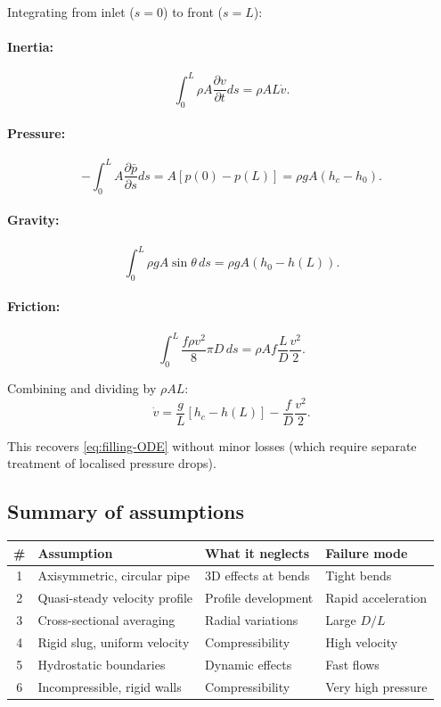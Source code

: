\documentclass[11pt]{article}
\begin{document}
Integrating from inlet ($s = 0$) to front ($s = L$):

\paragraph{Inertia:}
\[
  \int_0^L \rho A \frac{\partial v}{\partial t} ds = \rho A L \dot{v}.
\]

\paragraph{Pressure:}
\[
  -\int_0^L A \frac{\partial \bar{p}}{\partial s} ds = A[p(0) - p(L)] = \rho g A(h_c - h_0).
\]

\paragraph{Gravity:}
\[
  \int_0^L \rho g A \sin\theta \, ds = \rho g A(h_0 - h(L)).
\]

\paragraph{Friction:}
\[
  \int_0^L \frac{f\rho v^2}{8}\pi D \, ds = \rho A f \frac{L}{D}\frac{v^2}{2}.
\]

Combining and dividing by $\rho A L$:
\[
  \dot{v} = \frac{g}{L}[h_c - h(L)] - \frac{f}{D}\frac{v^2}{2}.
\]

This recovers \eqref{eq:filling-ODE} without minor losses (which require separate treatment of localised pressure drops).

\subsection{Summary of assumptions}

\begin{center}
\renewcommand{\arraystretch}{1.3}
\begin{tabular}{clll}
\toprule
\# & Assumption & What it neglects & Failure mode \\
\midrule
1 & Axisymmetric, circular pipe & 3D effects at bends & Tight bends \\
2 & Quasi-steady velocity profile & Profile development & Rapid acceleration \\
3 & Cross-sectional averaging & Radial variations & Large $D/L$ \\
4 & Rigid slug, uniform velocity & Compressibility & High velocity \\
5 & Hydrostatic boundaries & Dynamic effects & Fast flows \\
6 & Incompressible, rigid walls & Compressibility & Very high pressure \\
\bottomrule
\end{tabular}
\end{center}
\end{document}
